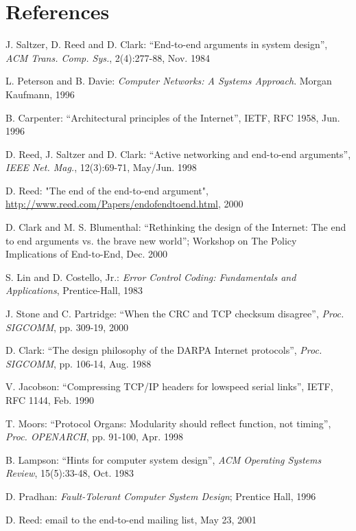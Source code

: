 \documentclass[a4paper,11pt,notitlepage,twoside,openright]{article}
\begin{document}
\hypertarget{references}{%
\section*{References}\label{references}}

\begin{enumerate}[label={[}\arabic*{]}]
\item
  J. Saltzer, D. Reed and D. Clark: ``End-to-end arguments in system
  design'', \emph{ACM Trans. Comp. Sys.}, 2(4):277-88, Nov. 1984
\item
  L. Peterson and B. Davie: \emph{Computer Networks: A Systems
  Approach}. Morgan Kaufmann, 1996
\item
  B. Carpenter: ``Architectural principles of the Internet'', IETF, RFC
  1958, Jun. 1996
\item
  D. Reed, J. Saltzer and D. Clark: ``Active networking and end-to-end
  arguments'', \emph{IEEE Net. Mag.}, 12(3):69-71, May/Jun. 1998
\item
  D. Reed: "The end of the end-to-end argument",
  \url{http://www.reed.com/Papers/endofendtoend.html}, 2000
\item
  D. Clark and M. S. Blumenthal: ``Rethinking the design of the
  Internet: The end to end arguments vs. the brave new world''; Workshop
  on The Policy Implications of
  End-to-End, Dec. 2000
\item
  S. Lin and D. Costello, Jr.: \emph{Error Control Coding: Fundamentals
  and Applications}, Prentice-Hall, 1983
\item
  J. Stone and C. Partridge: ``When the CRC and TCP checksum disagree'',
  \emph{Proc. SIGCOMM}, pp. 309-19, 2000
\item
  D. Clark: ``The design philosophy of the DARPA Internet protocols'',
  \emph{Proc. SIGCOMM}, pp. 106-14, Aug. 1988
\item
  V. Jacobson: ``Compressing TCP/IP headers for lowspeed serial links'',
  IETF, RFC 1144, Feb. 1990
\item
  T. Moors: ``Protocol Organs: Modularity should reflect function, not
  timing'', \emph{Proc. OPENARCH}, pp. 91-100, Apr. 1998
\item
  B. Lampson: ``Hints for computer system design'', \emph{ACM Operating
  Systems Review}, 15(5):33-48, Oct. 1983
\item
  D. Pradhan: \emph{Fault-Tolerant Computer System Design}; Prentice
  Hall, 1996
\item
  D. Reed: email to the end-to-end mailing list, May 23, 2001
\item

\end{enumerate}
\end{document}
